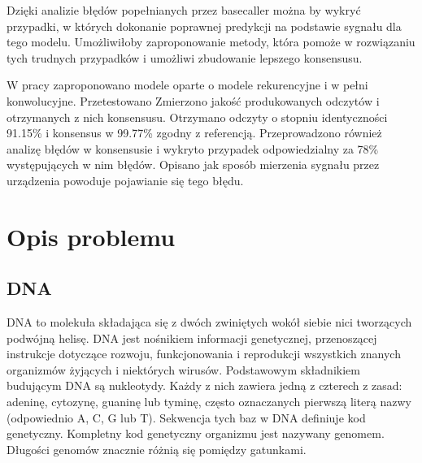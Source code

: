 \documentclass[a4paper,11pt,twoside]{report}
\theoremstyle{definition}
\begin{document}
Dzięki analizie błędów popełnianych przez basecaller można by wykryć przypadki, w których dokonanie poprawnej predykcji na podstawie sygnału dla tego modelu. Umożliwiłoby zaproponowanie metody, która pomoże w rozwiązaniu tych trudnych przypadków i umożliwi zbudowanie lepszego konsensusu.

W pracy zaproponowano modele oparte o modele rekurencyjne i w pełni konwolucyjne. Przetestowano Zmierzono jakość produkowanych odczytów i otrzymanych z nich konsensusu. Otrzymano odczyty o stopniu identyczności 91.15\% i konsensus w 99.77\% zgodny z referencją. Przeprowadzono również analizę błędów w konsensusie i wykryto przypadek odpowiedzialny za 78\% występujących w nim błędów. Opisano jak sposób mierzenia sygnału przez urządzenia powoduje pojawianie się tego błędu.


\chapter{Opis problemu}

\section{DNA}

DNA to molekuła składająca się z dwóch zwiniętych wokół siebie nici tworzących podwójną helisę. DNA jest nośnikiem informacji genetycznej, przenoszącej instrukcje dotyczące rozwoju, funkcjonowania i reprodukcji wszystkich znanych organizmów żyjących i niektórych wirusów. Podstawowym składnikiem budującym DNA są nukleotydy. Każdy z nich zawiera jedną z czterech z zasad: adeninę, cytozynę, guaninę lub tyminę, często oznaczanych pierwszą literą nazwy (odpowiednio A, C, G lub T). Sekwencja tych baz w DNA definiuje kod genetyczny. Kompletny kod genetyczny organizmu jest nazywany genomem. Długości genomów znacznie różnią się pomiędzy gatunkami.
\end{document}
